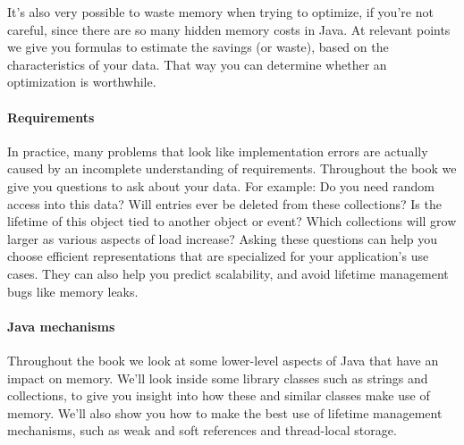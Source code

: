It's also very possible to waste memory when trying to optimize, if
you're not careful, since there are so many hidden memory costs in Java. At relevant
points we give you formulas to estimate the savings (or waste), based on
the characteristics of your data. That way you can determine whether an
optimization is worthwhile.

\paragraph{Requirements}In practice, many problems that look like implementation
errors are actually caused by an incomplete understanding of requirements. Throughout the book we
give you questions to ask about your data. For example: Do you need random access into this data? Will entries ever be deleted from these collections? Is the lifetime of this object tied to another object or event? Which
collections will grow larger as various aspects of load increase?  Asking these
questions can help you choose efficient representations that are specialized for your application's use cases.
They can also help you predict scalability, and avoid lifetime management bugs
like memory leaks.

\paragraph{Java mechanisms}Throughout the book we look at some
lower-level aspects of Java that have an impact on memory. We'll look
inside some library classes such as strings and collections, to give you insight
into how these and similar classes make use of memory.
We'll also show you how to make the best use of lifetime management mechanisms,
such as weak and soft references and thread-local storage.




